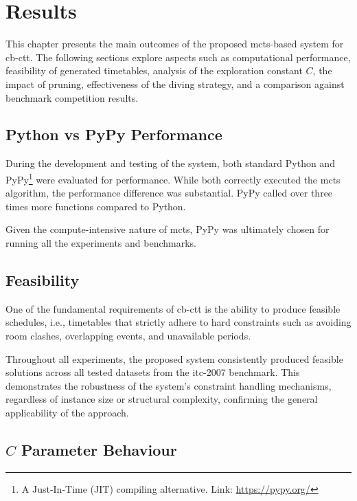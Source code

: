 \chapter{Results}

\label{Results}

This chapter presents the main outcomes of the proposed \ac{mcts}-based system for \ac{cb-ctt}. The following sections explore aspects such as computational performance, feasibility of generated timetables, analysis of the exploration constant \(C\), the impact of pruning, effectiveness of the diving strategy, and a comparison against benchmark competition results.

\section{Python vs PyPy Performance}

During the development and testing of the system, both standard Python and PyPy\footnote{A Just-In-Time (JIT) compiling alternative. Link: \url{https://pypy.org/}} were evaluated for performance. While both correctly executed the \ac{mcts} algorithm, the performance difference was substantial. PyPy called over three times more functions compared to Python.

Given the compute-intensive nature of \ac{mcts}, PyPy was ultimately chosen for running all the experiments and benchmarks.

\section{Feasibility}

One of the fundamental requirements of \ac{cb-ctt} is the ability to produce feasible schedules, i.e., timetables that strictly adhere to hard constraints such as avoiding room clashes, overlapping events, and unavailable periods.

Throughout all experiments, the proposed system consistently produced feasible solutions across all tested datasets from the \ac{itc-2007} benchmark. This demonstrates the robustness of the system's constraint handling mechanisms, regardless of instance size or structural complexity, confirming the general applicability of the approach.


\section{\(C\) Parameter Behaviour}

